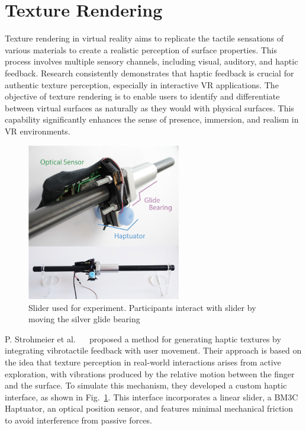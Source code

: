 \section{Texture Rendering}
Texture rendering in virtual reality aims to replicate the tactile sensations of various materials to create a realistic perception of surface properties. This process involves multiple sensory channels, including visual, auditory, and haptic feedback. Research consistently demonstrates that haptic feedback is crucial for authentic texture perception, especially in interactive VR applications. The objective of texture rendering is to enable users to identify and differentiate between virtual surfaces as naturally as they would with physical surfaces. This capability significantly enhances the sense of presence, immersion, and realism in VR environments.
\begin{figure}[H]\centering
	\includegraphics[width=0.6\textwidth]{Pictures/Texture_Rendering_1.png}%
	\caption{Slider used for experiment. Participants interact with slider by moving the silver glide bearing~\cite{10.1145/3025453.3025812}}\label{fig:Texture_Rendering_1}%
\end{figure}

P. Strohmeier et al. ~~\cite{10.1145/3025453.3025812} proposed a method for generating haptic textures by integrating vibrotactile feedback with user movement. Their approach is based on the idea that texture perception in real-world interactions arises from active exploration, with vibrations produced by the relative motion between the finger and the surface. To simulate this mechanism, they developed a custom haptic interface, as shown in Fig.~\ref{fig:Texture_Rendering_1}. This interface incorporates a linear slider, a BM3C Haptuator, an optical position sensor, and features minimal mechanical friction to avoid interference from passive forces.

